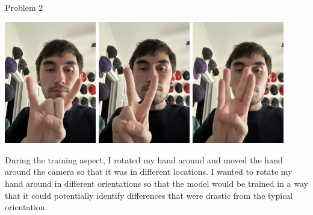 \begin{problem}{Problem 2}
\begin{Highlight}[Solution]
\begin{spacing}{1.50}
            \begin{center}
                \includegraphics[width = 0.30\textwidth]{./Images/Model 2/Training Images/Rock And Roll.jpg}
                \hspace*{10pt}
                \includegraphics[width = 0.30\textwidth]{./Images/Model 2/Training Images/Peace Sign.jpg}
                \hspace*{10pt}
                \includegraphics[width = 0.30\textwidth]{./Images/Model 2/Training Images/Spock.jpg}
            \end{center}

            During the training aspect, I rotated my hand around and moved the hand around the camera so that it was in different locations. I wanted to rotate my hand around in different orientations
            so that the model would be trained in a way that it could potentially identify differences that were drastic from the typical orientation.


\end{spacing}
\end{Highlight}
\end{problem}
